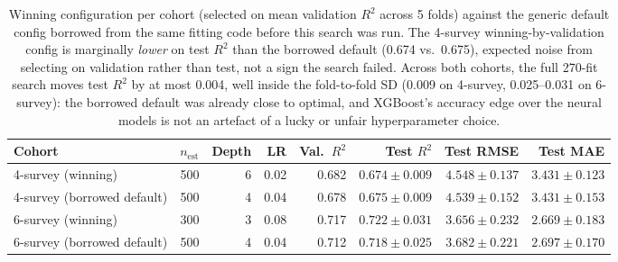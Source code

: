 \documentclass[logo,msc,ai]{infthesis}           %
\begin{document}
\begin{table}[H]
\centering
\scriptsize
\renewcommand{\arraystretch}{1.1}
\begin{tabular}{lrrrrrrr}
\toprule
Cohort & $n_{\mathrm{est}}$ & Depth & LR & Val.\ $R^2$ & Test $R^2$ & Test RMSE & Test MAE \\
\midrule
4-survey (winning) & 500 & 6 & 0.02 & 0.682 & $0.674\pm0.009$ & $4.548\pm0.137$ & $3.431\pm0.123$ \\
4-survey (borrowed default) & 500 & 4 & 0.04 & 0.678 & $0.675\pm0.009$ & $4.539\pm0.152$ & $3.431\pm0.153$ \\
6-survey (winning) & 300 & 3 & 0.08 & 0.717 & $0.722\pm0.031$ & $3.656\pm0.232$ & $2.669\pm0.183$ \\
6-survey (borrowed default) & 500 & 4 & 0.04 & 0.712 & $0.718\pm0.025$ & $3.682\pm0.221$ & $2.697\pm0.170$ \\
\bottomrule
\end{tabular}
\caption{\small{Winning configuration per cohort (selected on mean validation $R^2$ across 5
folds) against the generic default config borrowed from the same fitting code before this
search was run. The 4-survey winning-by-validation config is marginally \emph{lower} on test
$R^2$ than the borrowed default (0.674 vs.\ 0.675), expected noise from selecting on
validation rather than test, not a sign the search failed. Across both cohorts, the full
270-fit search moves test $R^2$ by at most 0.004, well inside the fold-to-fold SD (0.009 on
4-survey, 0.025--0.031 on 6-survey): the borrowed default was already close to optimal, and
XGBoost's accuracy edge over the neural models is not an artefact of a lucky or unfair
hyperparameter choice.}}
\label{tab:xgb-hyperparameter-search}
\end{table}

\end{document}

